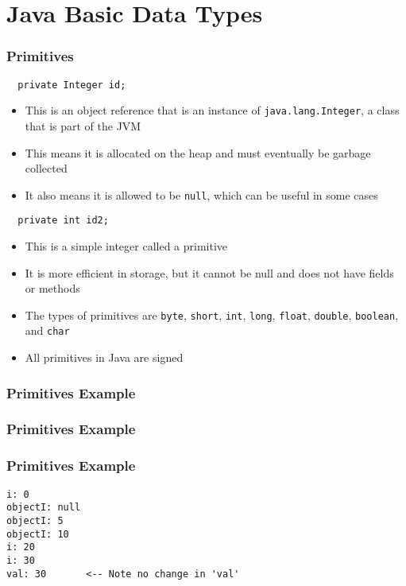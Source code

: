 \documentclass{beamer}
\begin{document}
\section{Java Basic Data Types}
\begin{frame}[fragile]
\frametitle{Primitives}
\lstset{language=Java}
\begin{lstlisting}
  private Integer id;
\end{lstlisting}
\begin{itemize}
\item This is an object reference that is an instance of \texttt{java.lang.Integer}, a class that is part of the JVM
\item This means it is allocated on the heap and must eventually be garbage collected
\item It also means it is allowed to be \texttt{null}, which can be useful in some cases
\end{itemize}
\lstset{language=Java}
\begin{lstlisting}
  private int id2;
\end{lstlisting}
\begin{itemize}
\item This is a simple integer called a primitive
\item It is more efficient in storage, but it cannot be null and does not have fields or methods
\item The types of primitives are \texttt{byte}, \texttt{short}, \texttt{int}, \texttt{long}, \texttt{float}, \texttt{double}, \texttt{boolean}, and \texttt{char}
\item All primitives in Java are signed
\end{itemize}
\end{frame}

\begin{frame}[fragile]
\frametitle{Primitives Example}

\end{frame}

\begin{frame}[fragile]
\frametitle{Primitives Example}

\end{frame}

\begin{frame}[fragile]
\frametitle{Primitives Example}
\lstset{language=}
\begin{lstlisting}
i: 0
objectI: null
objectI: 5
objectI: 10
i: 20
i: 30
val: 30       <-- Note no change in 'val'
\end{lstlisting}
\end{frame}
\end{document}
